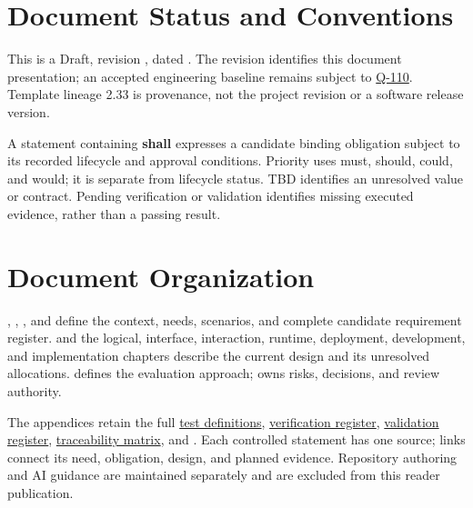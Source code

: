 \section{Document Status and Conventions}
This is a Draft, revision \DocumentVersion, dated \DocumentDate.
The revision identifies this document presentation; an accepted engineering
baseline remains subject to \hyperref[Question:Q-110]{Q-110}.
Template lineage 2.33 is provenance, not the project revision or a software
release version.

A statement containing \textbf{shall} expresses a candidate binding
obligation subject to its recorded lifecycle and approval conditions.
Priority uses \gls{must}, \gls{should}, \gls{could}, and \gls{would}; it is
separate from lifecycle status. TBD identifies an unresolved value or
contract. Pending verification or validation identifies missing executed
evidence, rather than a passing result.

\section{Document Organization}
, ,
, and  define the context,
needs, scenarios, and complete candidate requirement register.
 and the logical, interface, interaction,
runtime, deployment, development, and implementation chapters describe the
current design and its unresolved allocations.
 defines the evaluation approach;
 owns risks, decisions, and review authority.

The appendices retain the full \hyperref[Table:ProjectTests]{test definitions},
\hyperref[Table:VerificationRegister]{verification register},
\hyperref[Table:ValidationRegister]{validation register},
\hyperref[Table:TraceabilityMatrix]{traceability matrix}, and
. Each controlled statement has one source; links
connect its need, obligation, design, and planned evidence.
Repository authoring and AI guidance are maintained separately and are
excluded from this reader publication.
